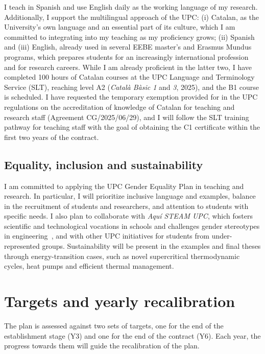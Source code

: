 \documentclass[11pt]{article}
\begin{document}
I teach in Spanish and use English daily as the working language of my research. 
Additionally, I support the multilingual approach of the UPC: (i) Catalan, as the University's own language and an essential part of its culture, which I am committed to integrating into my teaching as my proficiency grows; (ii) Spanish and (iii) English, already used in several EEBE master's and Erasmus Mundus programs, which prepares students for an increasingly international profession and for research careers.
While I am already proficient in the latter two, I have completed 100 hours of Catalan courses at the UPC Language and Terminology Service (SLT), reaching level A2 (\textit{Catal\`a B\`asic 1} and \textit{3}, 2025), and the B1 course is scheduled. 
I have requested the temporary exemption provided for in the UPC regulations on the accreditation of knowledge of Catalan for teaching and research staff (Agreement CG/2025/06/29), and I will follow the SLT training pathway for teaching staff with the goal of obtaining the C1 certificate within the first two years of the contract. 

\subsection{Equality, inclusion and sustainability}
I am committed to applying the UPC Gender Equality Plan in teaching and research.
In particular, I will prioritize inclusive language and examples, balance in the recruitment of students and researchers, and attention to students with specific needs. I also plan to collaborate with \textit{Aqu\'i STEAM UPC}, which fosters scientific and technological vocations in schools and challenges gender stereotypes in engineering~\cite{AquiSTEAM}, and with other UPC initiatives for students from under-represented groups.
Sustainability will be present in the examples and final theses through energy-transition cases, such as novel supercritical thermodynamic cycles, heat pumps and efficient thermal management.

\section{Targets and yearly recalibration}\label{sec:targets}

The plan is assessed against two sets of targets, one for the end of the establishment stage (Y3) and one for the end of the contract (Y6). 
Each year, the progress towards them will guide the recalibration of the plan.
\end{document}
